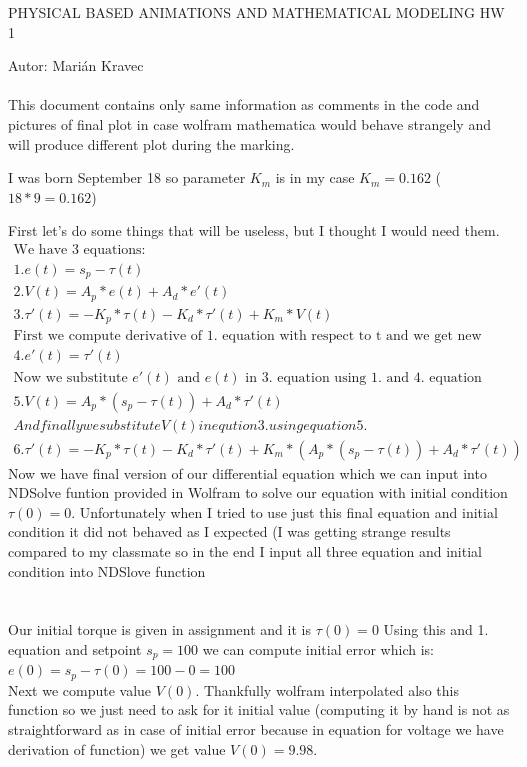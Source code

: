\documentclass[a4paper]{article}
\begin{document}
 
	
	\pagestyle{plain}
	
	\begin{center}
		\sc\large
		PHYSICAL BASED ANIMATIONS AND MATHEMATICAL MODELING HW 1 
	\end{center}
	
	Autor: Marián Kravec
	\\
	\\
	This document contains only same information as comments in the code and pictures of final plot in case wolfram mathematica would behave strangely and will produce different plot during the marking.
	
	I was born September 18 so parameter $K_m$ is in my case $K_m=0.162$ ($18*9=0.162$)
	
	First let's do some things that will be useless, but I thought I would need them.
	\begin{align*}
		\text{We have 3 equations:}
		\\
		1. e(t)=s_p-\tau(t)
		\\
		2. V(t)=A_p*e(t)+A_d*e'(t)
		\\
		3. \tau'(t)=-K_p*\tau(t)-K_d*\tau'(t)+K_m*V(t)
		\\
		\text{First we compute derivative of 1. equation with respect to t and we get new equation:}
		\\
		4. e'(t)=\tau'(t)
		\\
		\text{Now we substitute $e'(t)$ and $e(t)$ in 3. equation using 1. and 4. equation}
		\\
		5. V(t)=A_p*(s_p-\tau(t))+A_d*\tau'(t)
		\\
		And finally we substitute V(t) in eqution 3. using equation 5.
		\\
		6. \tau'(t)=-K_p*\tau(t)-K_d*\tau'(t)+K_m*(A_p*(s_p-\tau(t))+A_d*\tau'(t))
	\end{align*}
	Now we have final version of our differential equation which we can input into NDSolve funtion provided in Wolfram to solve our equation with initial condition $\tau(0)=0$. Unfortunately when I tried to use just this final equation and initial condition it did not behaved as I expected (I was getting strange results compared to my classmate so in the end I input all three equation and initial condition into NDSlove function 
	\section{} 
	\subsection{}
	Our initial torque is given in assignment and it is $\tau(0)=0$
	Using this and 1. equation and setpoint $s_p=100$ we can compute initial error which is:
	$e(0)=s_p-\tau(0)=100-0=100$
	\\
	Next we compute value $V(0)$. Thankfully wolfram interpolated also this function so we just need to ask for it initial value (computing it by hand is not as straightforward as in case of initial error because in equation for voltage we have derivation of function) we get value $V(0)=9.98$.
	
\end{document}

